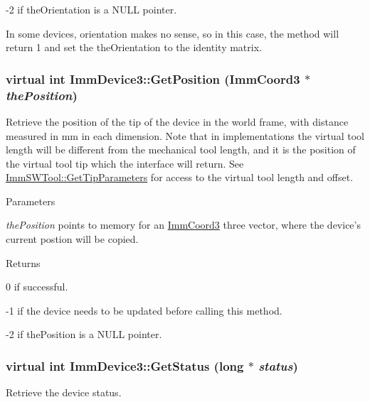 -\/2 if theOrientation is a NULL pointer.

In some devices, orientation makes no sense, so in this case, the method will return 1 and set the theOrientation to the identity matrix. \hypertarget{classImmDevice3_a6481f3b77eea4ee4f9d29aa5a109aa31}{
\subsubsection[{GetPosition}]{\setlength{\rightskip}{0pt plus 5cm}virtual int ImmDevice3::GetPosition ({\bf ImmCoord3} $\ast$ {\em thePosition})}}
\label{classImmDevice3_a6481f3b77eea4ee4f9d29aa5a109aa31}
Retrieve the position of the tip of the device in the world frame, with distance measured in mm in each dimension. Note that in implementations the virtual tool length will be different from the mechanical tool length, and it is the position of the virtual tool tip which the interface will return. See \hyperlink{classImmSWTool_afa3068b7a4575c255654378134f524c0}{ImmSWTool::GetTipParameters} for access to the virtual tool length and offset.


\begin{DoxyParams}{Parameters}
\item[{\em thePosition}]points to memory for an \hyperlink{structImmCoord3}{ImmCoord3} three vector, where the device's current postion will be copied.\end{DoxyParams}
\begin{DoxyReturn}{Returns}

\end{DoxyReturn}
0 if successful.

-\/1 if the device needs to be updated before calling this method.

-\/2 if thePosition is a NULL pointer. \hypertarget{classImmDevice3_a59d37414c27386d0e5bd414de0ad3d3a}{
\subsubsection[{GetStatus}]{\setlength{\rightskip}{0pt plus 5cm}virtual int ImmDevice3::GetStatus (long $\ast$ {\em status})}}
\label{classImmDevice3_a59d37414c27386d0e5bd414de0ad3d3a}
Retrieve the device status.


